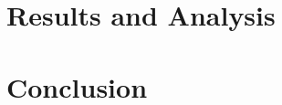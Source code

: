 \documentclass[14pt]{article}
\begin{document}
\begin{multicols}{2}
	
	\section{Results and Analysis}
	
	\section{Conclusion}
\end{multicols}
\end{document}
